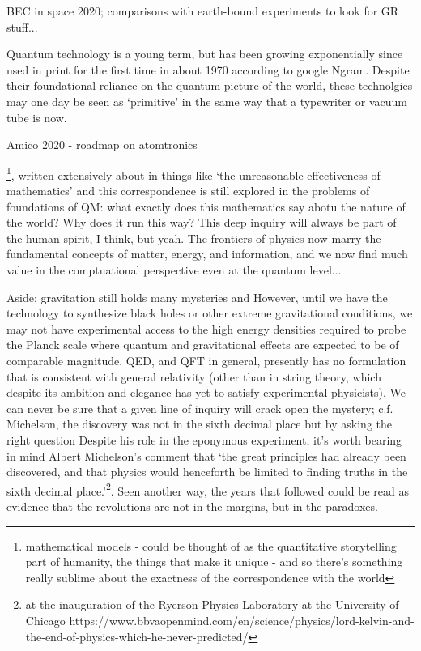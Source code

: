 	BEC in space 2020; comparisons with earth-bound experiments to look for GR stuff...

	
	Quantum technology is a young term, but has been growing exponentially	since used in print for the first time in about 1970 according to google	Ngram. 
	Despite their foundational reliance on the quantum picture
	of the world, these technolgies may one day be seen as `primitive' in
	the same way that a typewriter or vacuum tube is now.

	Amico 2020 - roadmap on atomtronics

\footnote{mathematical models - could be thought of as the quantitative storytelling part of humanity, the things that make it unique - and so there's something really sublime about the exactness of the correspondence with the world}, written extensively about in things like `the unreasonable effectiveness of mathematics' and this correspondence is still explored in the problems of foundations of QM: what exactly does this mathematics say abotu the nature of the world? Why does it run this way? This deep inquiry will always be part of the human spirit, I think, but yeah.
The frontiers of physics now marry the fundamental concepts of matter, energy, and information, and we now find much value in the comptuational perspective even at the quantum level...

Aside; gravitation still holds many mysteries and 
	However, until we have the technology to synthesize black holes or other extreme gravitational conditions, we may not have experimental access to the high energy densities required to probe the Planck scale where quantum and gravitational effects are expected to be of comparable magnitude.
	QED, and QFT in general, presently has no formulation that is consistent with general relativity (other than in string theory, which despite its ambition and elegance has yet to satisfy experimental physicists).
	We can never be sure that a given line of inquiry will crack open the mystery; c.f. Michelson, the discovery was not in the sixth decimal place but by asking the right question
	Despite his role in the eponymous experiment, it's worth bearing in mind Albert Michelson's comment that `the great principles had already been discovered, and that physics would henceforth be limited to finding truths in the sixth decimal place.'\footnote{ at the inauguration of the Ryerson Physics Laboratory at the University of Chicago https://www.bbvaopenmind.com/en/science/physics/lord-kelvin-and-the-end-of-physics-which-he-never-predicted/}.
	Seen another way, the years that followed could be read as evidence that the revolutions are not in the margins, but in the paradoxes.

